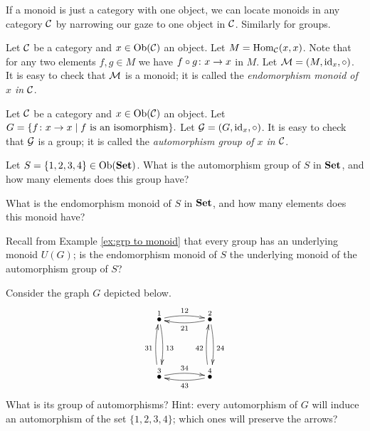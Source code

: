 If a monoid is just a category with one object, we can locate monoids in any category $\mathcal{C}$ by narrowing our gaze to one object in $\mathcal{C}$. Similarly for groups.

\begin{example}

Let $\mathcal{C}$ be a category and $x\in\textnormal{Ob}(\mathcal{C})$ an object. Let $M=\textnormal{Hom}_\mathcal{C}(x,x)$. Note that for any two elements $f,g\in M$ we have $f\circ g\colon x\rightarrow x$ in $M$. Let $\mathcal{M}=(M,\textnormal{id}_x,\circ)$. It is easy to check that $\mathcal{M}$ is a monoid; it is called the {\em endomorphism monoid of $x$ in $\mathcal{C}$}.

\end{example}

\begin{example}

Let $\mathcal{C}$ be a category and $x\in\textnormal{Ob}(\mathcal{C})$ an object. Let $G=\{f\colon x\rightarrow x{\;|\;}f\textnormal{ is an isomorphism}\}.$ Let $\mathcal{G}=(G,\textnormal{id}_x,\circ)$. It is easy to check that $\mathcal{G}$ is a group; it is called the {\em automorphism group of $x$ in $\mathcal{C}$}.

\end{example}

\begin{exercise}
Let $S=\{1,2,3,4\}\in\textnormal{Ob}({\bf Set})$.
\sexc What is the automorphism group of $S$ in ${\bf Set}$, and how many elements does this group have?
\item What is the endomorphism monoid of $S$ in ${\bf Set}$, and how many elements does this monoid have? 
\item Recall from Example \ref{ex:grp to monoid} that every group has an underlying monoid $U(G)$; is the endomorphism monoid of $S$ the underlying monoid of the automorphism group of $S$?
\endsexc
\end{exercise}

\begin{exercise}\label{exc:symmetric square}
Consider the graph $G$ depicted below. 
$$
\xymatrix@=40pt{
\LMO{1}\ar@/^.3pc/[r]^{12}\ar@/^.3pc/[d]^{13}&\LMO{2}\ar@/^.3pc/[d]^{24}\ar@/^.3pc/[l]^{21}\\
\LMO{3}\ar@/^.3pc/[r]^{34}\ar@/^.3pc/[u]^{31}&\LMO{4}\ar@/^.3pc/[u]^{42}\ar@/^.3pc/[l]^{43}
}
$$
What is its group of automorphisms? Hint: every automorphism of $G$ will induce an automorphism of the set $\{1,2,3,4\}$; which ones will preserve the arrows?
\end{exercise}

